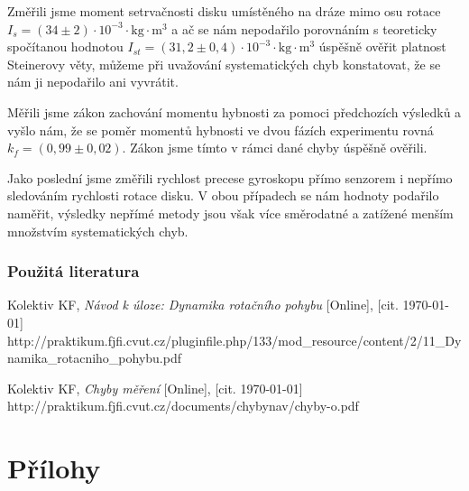 \documentclass[english]{article}
\newcommand{\unit}[1]{\mathrm{#1}}
\begin{document}
	Změřili jsme moment setrvačnosti disku umístěného na dráze mimo osu rotace $I_{s} = (34\pm2) \cdot \unit{10^{-3} \cdot kg \cdot m^3}$ a ač se nám nepodařilo porovnáním s teoreticky spočítanou hodnotou $I_{st} = (31,2\pm0,4) \cdot \unit{10^{-3} \cdot kg \cdot m^3}$ úspěšně ověřit platnost Steinerovy věty, můžeme při uvažování systematických chyb konstatovat, že se nám ji nepodařilo ani vyvrátit.
	
	Měřili jsme zákon zachování momentu hybnosti za pomoci předchozích výsledků a vyšlo nám, že se poměr momentů hybnosti ve dvou fázích experimentu rovná $k_f = (0,99\pm0,02)$. Zákon jsme tímto v rámci dané chyby úspěšně ověřili.
	
	Jako poslední jsme změřili rychlost precese gyroskopu přímo senzorem i nepřímo sledováním rychlosti rotace disku. V obou případech se nám hodnoty podařilo naměřit, výsledky nepřímé metody jsou však více směrodatné a zatížené menším množstvím systematických chyb.

	
\section {Použitá literatura}
\begingroup
\renewcommand{\section}[2]{}

\begin{thebibliography}{9}
 Kolektiv KF, \emph{Návod k úloze: Dynamika rotačního pohybu} [Online], [cit. \today] \newline 
http://praktikum.fjfi.cvut.cz/pluginfile.php/133/mod\_resource/content/2/11\_Dynamika\_rotacniho\_pohybu.pdf


 Kolektiv KF, \emph{Chyby měření} [Online], [cit. \today] \newline http://praktikum.fjfi.cvut.cz/documents/chybynav/chyby-o.pdf

\end{thebibliography}
\endgroup


\part{Přílohy}
\end{document}
